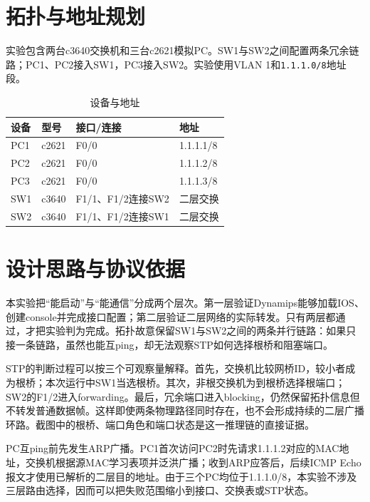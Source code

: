 \documentclass[UTF8,a4paper,12pt]{ctexart}
\begin{document}
\section{拓扑与地址规划}
实验包含两台c3640交换机和三台c2621模拟PC。SW1与SW2之间配置两条冗余链路；PC1、PC2接入SW1，PC3接入SW2。实验使用VLAN 1和\texttt{1.1.1.0/8}地址段。
\begin{table}[H]\centering\caption{设备与地址}\begin{tabular}{llll}\toprule
设备 & 型号 & 接口/连接 & 地址\\\midrule
PC1 & c2621 & F0/0 & 1.1.1.1/8\\ PC2 & c2621 & F0/0 & 1.1.1.2/8\\ PC3 & c2621 & F0/0 & 1.1.1.3/8\\ SW1 & c3640 & F1/1、F1/2连接SW2 & 二层交换\\ SW2 & c3640 & F1/1、F1/2连接SW1 & 二层交换\\\bottomrule\end{tabular}\end{table}
\section{设计思路与协议依据}
本实验把“能启动”与“能通信”分成两个层次。第一层验证Dynamips能够加载IOS、创建console并完成接口配置；第二层验证二层网络的实际转发。只有两层都通过，才把实验判为完成。拓扑故意保留SW1与SW2之间的两条并行链路：如果只接一条链路，虽然也能互ping，却无法观察STP如何选择根桥和阻塞端口。

STP的判断过程可以按三个可观察量解释。首先，交换机比较网桥ID，较小者成为根桥；本次运行中SW1当选根桥。其次，非根交换机为到根桥选择根端口；SW2的F1/2进入forwarding。最后，冗余端口进入blocking，仍然保留拓扑信息但不转发普通数据帧。这样即使两条物理路径同时存在，也不会形成持续的二层广播环路。截图中的根桥、端口角色和端口状态是这一推理链的直接证据。

PC互ping前先发生ARP广播。PC1首次访问PC2时先请求1.1.1.2对应的MAC地址，交换机根据源MAC学习表项并泛洪广播；收到ARP应答后，后续ICMP Echo报文才使用已解析的二层目的地址。由于三个PC均位于1.1.1.0/8，本实验不涉及三层路由选择，因而可以把失败范围缩小到接口、交换表或STP状态。
\end{document}
